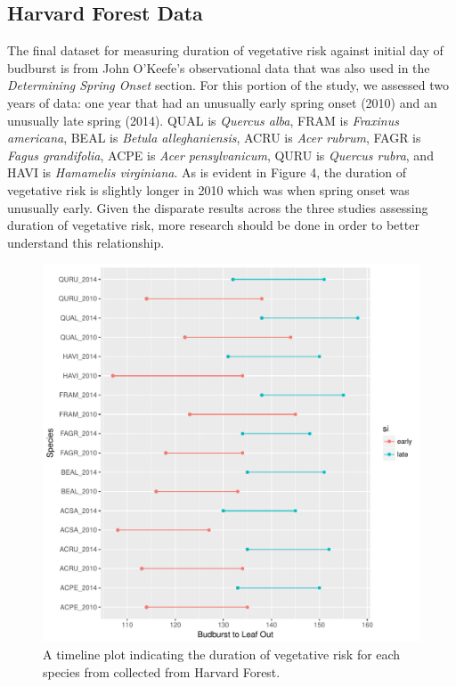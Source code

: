 \documentclass{article}\usepackage[]{graphicx}\usepackage[]{color}
\makeatletter
\def\maxwidth{ %
  \ifdim\Gin@nat@width>\linewidth
    \linewidth
  \else
    \Gin@nat@width
  \fi
}
\makeatother
\begin{document}
\subsection*{Harvard Forest Data}
The final dataset for measuring duration of vegetative risk against initial day of budburst is from John O'Keefe's observational data that was also used in the \textit{Determining Spring Onset} section. For this portion of the study, we assessed two years of data: one year that had an unusually early spring onset (2010) and an unusually late spring (2014). QUAL is \textit{Quercus alba}, FRAM is \textit{Fraxinus americana}, BEAL is \textit{Betula alleghaniensis}, ACRU is \textit{Acer rubrum}, FAGR is \textit{Fagus grandifolia}, ACPE is \textit{Acer pensylvanicum}, QURU is \textit{Quercus rubra}, and HAVI is \textit{Hamamelis virginiana}. As is evident in Figure 4, the duration of vegetative risk is slightly longer in 2010 which was when spring onset was unusually early. Given the disparate results across the three studies assessing duration of vegetative risk, more research should be done in order to better understand this relationship. 


\begin{figure}[H]
\includegraphics[width=\maxwidth]{figure/forest-1} \caption[A timeline plot indicating the duration of vegetative risk for each species from collected from Harvard Forest]{A timeline plot indicating the duration of vegetative risk for each species from collected from Harvard Forest.}\label{fig:forest}
\end{figure}
\end{document}
